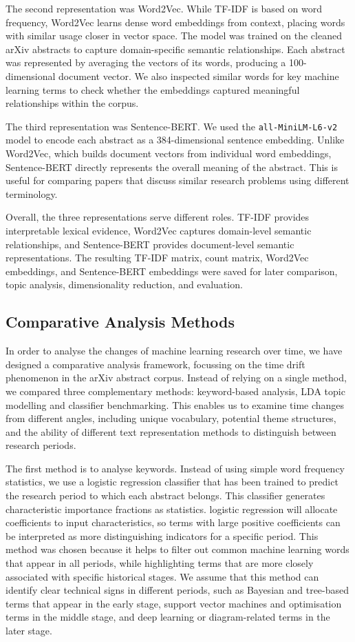 \documentclass[11pt]{article}
\begin{document}
The second representation was Word2Vec. While TF-IDF is based on word frequency, Word2Vec learns dense word embeddings from context, placing words with similar usage closer in vector space. The model was trained on the cleaned arXiv abstracts to capture domain-specific semantic relationships. Each abstract was represented by averaging the vectors of its words, producing a 100-dimensional document vector. We also inspected similar words for key machine learning terms to check whether the embeddings captured meaningful relationships within the corpus.

The third representation was Sentence-BERT. We used the \texttt{all-MiniLM-L6-v2} model to encode each abstract as a 384-dimensional sentence embedding. Unlike Word2Vec, which builds document vectors from individual word embeddings, Sentence-BERT directly represents the overall meaning of the abstract. This is useful for comparing papers that discuss similar research problems using different terminology.

Overall, the three representations serve different roles. TF-IDF provides interpretable lexical evidence, Word2Vec captures domain-level semantic relationships, and Sentence-BERT provides document-level semantic representations. The resulting TF-IDF matrix, count matrix, Word2Vec embeddings, and Sentence-BERT embeddings were saved for later comparison, topic analysis, dimensionality reduction, and evaluation.

\subsection{Comparative Analysis Methods}

In order to analyse the changes of machine learning research over time, we have designed a comparative analysis framework, focussing on the time drift phenomenon in the arXiv abstract corpus. Instead of relying on a single method, we compared three complementary methods: keyword-based analysis, LDA topic modelling and classifier benchmarking. This enables us to examine time changes from different angles, including unique vocabulary, potential theme structures, and the ability of different text representation methods to distinguish between research periods.

The first method is to analyse keywords. Instead of using simple word frequency statistics, we use a logistic  regression classifier that has been trained to predict the research period to which each abstract belongs. This classifier generates characteristic importance fractions as statistics. logistic  regression will allocate coefficients to input characteristics, so terms with large positive coefficients can be interpreted as more distinguishing indicators for a specific period. This method was chosen because it helps to filter out common machine learning words that appear in all periods, while highlighting terms that are more closely associated with specific historical stages. We assume that this method can identify clear technical signs in different periods, such as Bayesian and tree-based terms that appear in the early stage, support vector machines and optimisation terms in the middle stage, and deep learning or diagram-related terms in the later stage.
\end{document}
